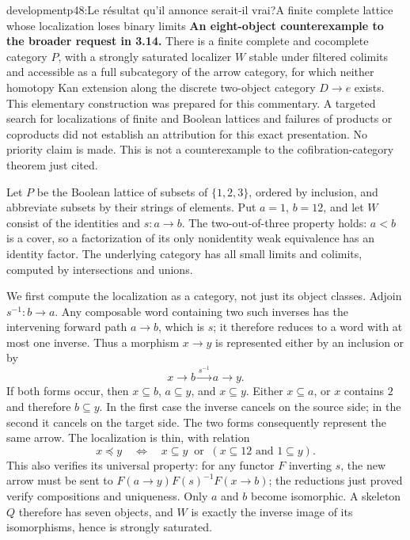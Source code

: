 \begin{dcomment}{development}{p48:Le résultat qu'il annonce serait-il vrai?}{A finite complete lattice whose localization loses binary limits}
\textbf{An eight-object counterexample to the broader request in 3.14.}\ours
There is a finite complete and cocomplete category $P$, with a strongly saturated localizer $W$ stable under filtered colimits and accessible as a full subcategory of the arrow category, for which neither homotopy Kan extension along the discrete two-object category $D\to e$ exists. This elementary construction was prepared for this commentary. A targeted search for localizations of finite and Boolean lattices and failures of products or coproducts did not establish an attribution for this exact presentation. No priority claim is made. This is not a counterexample to the cofibration-category theorem just cited.

Let $P$ be the Boolean lattice of subsets of $\{1,2,3\}$, ordered by inclusion, and abbreviate subsets by their strings of elements. Put $a=1$, $b=12$, and let $W$ consist of the identities and $s:a\to b$. The two-out-of-three property holds: $a<b$ is a cover, so a factorization of its only nonidentity weak equivalence has an identity factor. The underlying category has all small limits and colimits, computed by intersections and unions.

We first compute the localization as a category, not just its object classes. Adjoin $s^{-1}:b\to a$. Any composable word containing two such inverses has the intervening forward path $a\to b$, which is $s$; it therefore reduces to a word with at most one inverse. Thus a morphism $x\to y$ is represented either by an inclusion or by
\[
 x\longrightarrow b\xrightarrow{s^{-1}}a\longrightarrow y.
\]
If both forms occur, then $x\subseteq b$, $a\subseteq y$, and $x\subseteq y$. Either $x\subseteq a$, or $x$ contains $2$ and therefore $b\subseteq y$. In the first case the inverse cancels on the source side; in the second it cancels on the target side. The two forms consequently represent the same arrow. The localization is thin, with relation
\[
 x\preceq y\quad\Longleftrightarrow\quad
 x\subseteq y\ \text{ or }\ (x\subseteq12\text{ and }1\subseteq y).
\]
This also verifies its universal property: for any functor $F$ inverting $s$, the new arrow must be sent to
$F(a\to y)F(s)^{-1}F(x\to b)$; the reductions just proved verify compositions and uniqueness. Only $a$ and $b$ become isomorphic. A skeleton $Q$ therefore has seven objects, and $W$ is exactly the inverse image of its isomorphisms, hence is strongly saturated.


\end{dcomment}
